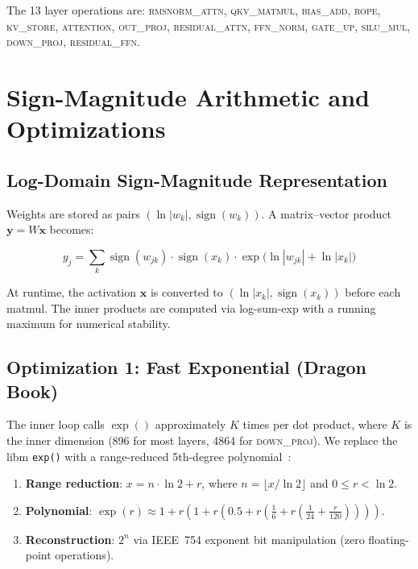 \documentclass[acmsmall,nonacm]{acmart}
\begin{document}
The 13 layer operations are: \textsc{rmsnorm\_attn},
\textsc{qkv\_matmul}, \textsc{bias\_add}, \textsc{rope},
\textsc{kv\_store}, \textsc{attention}, \textsc{out\_proj},
\textsc{residual\_attn}, \textsc{ffn\_norm}, \textsc{gate\_up},
\textsc{silu\_mul}, \textsc{down\_proj}, \textsc{residual\_ffn}.


\section{Sign-Magnitude Arithmetic and Optimizations}
\label{sec:optimizations}

\subsection{Log-Domain Sign-Magnitude Representation}

Weights are stored as pairs $(\ln|w_k|, \operatorname{sign}(w_k))$.
A matrix--vector product $\mathbf{y} = W\mathbf{x}$ becomes:

\begin{equation}
y_j = \sum_{k} \operatorname{sign}(w_{jk}) \cdot
  \operatorname{sign}(x_k) \cdot
  \exp\!\bigl(\ln|w_{jk}| + \ln|x_k|\bigr)
\label{eq:smmatmul}
\end{equation}

At runtime, the activation $\mathbf{x}$ is converted to
$(\ln|x_k|, \operatorname{sign}(x_k))$ before each matmul.  The
inner products are computed via log-sum-exp with a running maximum
for numerical stability.

\subsection{Optimization 1: Fast Exponential (Dragon Book)}

The inner loop calls $\exp()$ approximately $K$ times per dot
product, where $K$ is the inner dimension (896 for most layers,
4864 for \textsc{down\_proj}).  We replace the libm \texttt{exp()}
with a range-reduced 5th-degree polynomial~\cite{dragonbook}:

\begin{enumerate}
\item \textbf{Range reduction}: $x = n \cdot \ln 2 + r$,
  where $n = \lfloor x / \ln 2 \rfloor$ and $0 \le r < \ln 2$.
\item \textbf{Polynomial}: $\exp(r) \approx 1 + r(1 + r(0.5 +
  r(\tfrac{1}{6} + r(\tfrac{1}{24} + \tfrac{r}{120}))))$.
\item \textbf{Reconstruction}: $2^n$ via IEEE~754 exponent bit
  manipulation (zero floating-point operations).
\end{enumerate}
\end{document}
